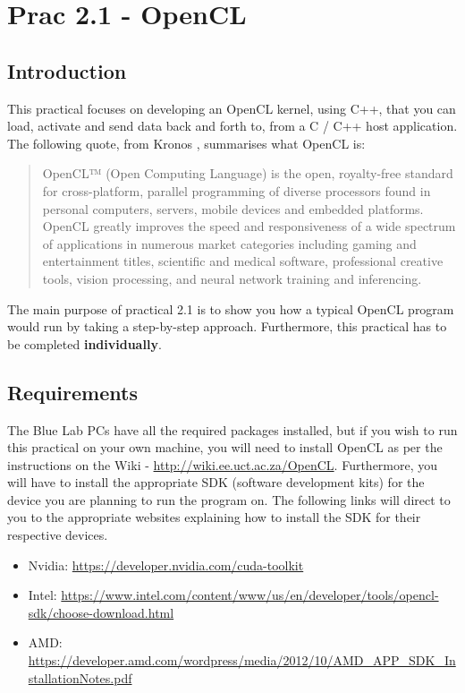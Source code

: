 \newpage
\section{Prac 2.1 - OpenCL}
\label{sec:Prac2}

\subsection{Introduction}

This practical focuses on  developing an OpenCL kernel, using C++, that you can load, activate and send data back and forth to, from a C / C++ host application. The following quote, from Kronos \cite{opencl_khronos}, summarises what  OpenCL is:

\begin{quote}
    OpenCL™ (Open Computing Language) is the open, royalty-free standard for cross-platform, parallel programming of diverse processors found in personal computers, servers, mobile devices and embedded platforms. OpenCL greatly improves the speed and responsiveness of a wide spectrum of applications in numerous market categories including gaming and entertainment titles, scientific and medical software, professional creative tools, vision processing, and neural network training and inferencing. \cite{opencl_khronos}
\end{quote}

The main purpose of practical 2.1 is to show you how a typical OpenCL program would run by taking a step-by-step approach. Furthermore, this practical has to be completed \textbf{individually}.

\subsection{Requirements}
The Blue Lab PCs have all the required packages installed, but if you wish to run this practical on your own machine, you will need to install OpenCL as per the instructions on the Wiki - \href{http://wiki.ee.uct.ac.za/OpenCL}{http://wiki.ee.uct.ac.za/OpenCL}. Furthermore, you will have to install the appropriate SDK (software development kits) for the device you are planning to run the program on. The following links will direct to you to the appropriate websites explaining how to install the SDK for their respective devices.
\begin{itemize}
    \item Nvidia: \href{https://developer.nvidia.com/cuda-toolkit}{https://developer.nvidia.com/cuda-toolkit}
    \item Intel: \href{https://www.intel.com/content/www/us/en/developer/tools/opencl-sdk/choose-download.html}{https://www.intel.com/content/www/us/en/developer/tools/opencl-sdk/choose-download.html}
    \item AMD: \href{https://developer.amd.com/wordpress/media/2012/10/AMD_APP_SDK_InstallationNotes.pdf}{https://developer.amd.com/wordpress/media/2012/10/AMD\_APP\_SDK\_InstallationNotes.pdf}
\end{itemize}

